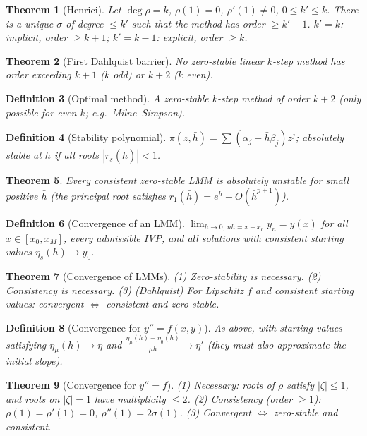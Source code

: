 \documentclass[10pt,a4paper]{article}
\theoremstyle{tight}
\newtheorem{theorem}{Theorem}[section]
\newtheorem{definition}[theorem]{Definition}
\newcommand{\hb}{\bar h}
\begin{document}
\begin{theorem}[Henrici]
Let \(\deg\rho=k\), \(\rho(1)=0\), \(\rho'(1)\ne0\), \(0\le k'\le k\). There is a unique \(\sigma\) of
degree \(\le k'\) such that the method has order \(\ge k'+1\). \(k'=k\): implicit, order \(\ge k+1\);
\(k'=k-1\): explicit, order \(\ge k\).
\end{theorem}

\begin{theorem}[First Dahlquist barrier]
No zero-stable linear \(k\)-step method has order exceeding \(k+1\) (\(k\) odd) or \(k+2\) (\(k\) even).
\end{theorem}

\begin{definition}[Optimal method]
A zero-stable \(k\)-step method of order \(k+2\) (only possible for even \(k\); e.g.\ Milne--Simpson).
\end{definition}

\begin{definition}[Stability polynomial]
\(\pi(z,\hb)=\sum(\alpha_j-\hb\beta_j)z^j\); absolutely stable at \(\hb\) if all roots \(|r_s(\hb)|<1\).
\end{definition}

\begin{theorem}
Every consistent zero-stable LMM is absolutely unstable for small positive \(\hb\)
(the principal root satisfies \(r_1(\hb)=e^{\hb}+O(\hb^{p+1})\)).
\end{theorem}

\begin{definition}[Convergence of an LMM]
\(\lim_{h\to0,\,nh=x-x_0}y_n=y(x)\) for all \(x\in[x_0,x_M]\), every admissible IVP, and all
solutions with consistent starting values \(\eta_s(h)\to y_0\).
\end{definition}

\begin{theorem}[Convergence of LMMs]
(1) Zero-stability is necessary. (2) Consistency is necessary. (3) (Dahlquist) For Lipschitz \(f\)
and consistent starting values: convergent \(\iff\) consistent and zero-stable.
\end{theorem}

\begin{definition}[Convergence for \(y''=f(x,y)\)]
As above, with starting values satisfying \(\eta_\mu(h)\to\eta\) and
\(\frac{\eta_\mu(h)-\eta_0(h)}{\mu h}\to\eta'\) (they must also approximate the initial slope).
\end{definition}

\begin{theorem}[Convergence for \(y''=f\)]
(1) Necessary: roots of \(\rho\) satisfy \(|\zeta|\le1\), and roots on \(|\zeta|=1\) have multiplicity
\(\le2\). (2) Consistency (order \(\ge1\)): \(\rho(1)=\rho'(1)=0\), \(\rho''(1)=2\sigma(1)\).
(3) Convergent \(\iff\) zero-stable and consistent.
\end{theorem}
\end{document}
